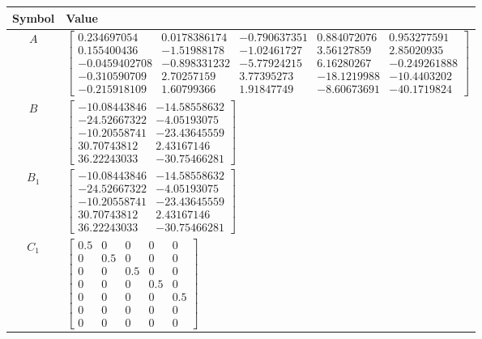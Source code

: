 \begin{tabular}{cl}
\hline
  Symbol  & Value                                                                                                                                                                                                                                                                                                                                                                                             \\
\hline
   $A$    & $\left[\begin{matrix}0.234697054 & 0.0178386174 & -0.790637351 & 0.884072076 & 0.953277591\\0.155400436 & -1.51988178 & -1.02461727 & 3.56127859 & 2.85020935\\-0.0459402708 & -0.898331232 & -5.77924215 & 6.16280267 & -0.249261888\\-0.310590709 & 2.70257159 & 3.77395273 & -18.1219988 & -10.4403202\\-0.215918109 & 1.60799366 & 1.91847749 & -8.60673691 & -40.1719824\end{matrix}\right]$ \\
   $B$    & $\left[\begin{matrix}-10.08443846 & -14.58558632\\-24.52667322 & -4.05193075\\-10.20558741 & -23.43645559\\30.70743812 & 2.43167146\\36.22243033 & -30.75466281\end{matrix}\right]$                                                                                                                                                                                                               \\
 $B_{1}$  & $\left[\begin{matrix}-10.08443846 & -14.58558632\\-24.52667322 & -4.05193075\\-10.20558741 & -23.43645559\\30.70743812 & 2.43167146\\36.22243033 & -30.75466281\end{matrix}\right]$                                                                                                                                                                                                               \\
 $C_{1}$  & $\left[\begin{matrix}0.5 & 0 & 0 & 0 & 0\\0 & 0.5 & 0 & 0 & 0\\0 & 0 & 0.5 & 0 & 0\\0 & 0 & 0 & 0.5 & 0\\0 & 0 & 0 & 0 & 0.5\\0 & 0 & 0 & 0 & 0\\0 & 0 & 0 & 0 & 0\end{matrix}\right]$                                                                                                                                                                                                            \\

\end{tabular}
